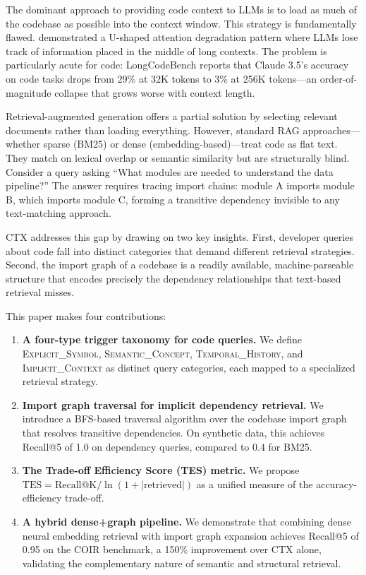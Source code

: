 \documentclass[11pt]{article}
\begin{document}
The dominant approach to providing code context to LLMs is to load as much of the codebase as possible into the context window. This strategy is fundamentally flawed. \citet{shi2024distracted} demonstrated a U-shaped attention degradation pattern where LLMs lose track of information placed in the middle of long contexts. The problem is particularly acute for code: LongCodeBench \citep{guo2025longcodebench} reports that Claude 3.5's accuracy on code tasks drops from 29\% at 32K tokens to 3\% at 256K tokens---an order-of-magnitude collapse that grows worse with context length.

Retrieval-augmented generation offers a partial solution by selecting relevant documents rather than loading everything. However, standard RAG approaches---whether sparse (BM25) or dense (embedding-based)---treat code as flat text. They match on lexical overlap or semantic similarity but are structurally blind. Consider a query asking ``What modules are needed to understand the data pipeline?'' The answer requires tracing import chains: module A imports module B, which imports module C, forming a transitive dependency invisible to any text-matching approach.

CTX addresses this gap by drawing on two key insights. First, developer queries about code fall into distinct categories that demand different retrieval strategies. Second, the import graph of a codebase is a readily available, machine-parseable structure that encodes precisely the dependency relationships that text-based retrieval misses.

This paper makes four contributions:

\begin{enumerate}
\item \textbf{A four-type trigger taxonomy for code queries.} We define \textsc{Explicit\_Symbol}, \textsc{Semantic\_Concept}, \textsc{Temporal\_History}, and \textsc{Implicit\_Context} as distinct query categories, each mapped to a specialized retrieval strategy.

\item \textbf{Import graph traversal for implicit dependency retrieval.} We introduce a BFS-based traversal algorithm over the codebase import graph that resolves transitive dependencies. On synthetic data, this achieves Recall@5 of 1.0 on dependency queries, compared to 0.4 for BM25.

\item \textbf{The Trade-off Efficiency Score (TES) metric.} We propose $\text{TES} = \text{Recall@K} / \ln(1 + |\text{retrieved}|)$ as a unified measure of the accuracy-efficiency trade-off.

\item \textbf{A hybrid dense+graph pipeline.} We demonstrate that combining dense neural embedding retrieval with import graph expansion achieves Recall@5 of 0.95 on the COIR benchmark, a 150\% improvement over CTX alone, validating the complementary nature of semantic and structural retrieval.
\end{enumerate}
\end{document}
